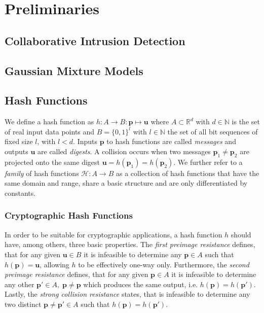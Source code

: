\chapter{Preliminaries}


\section{Collaborative Intrusion Detection}


\section{Gaussian Mixture Models}


\section{Hash Functions}

We define a hash function as $h: A \rightarrow B : \bm{p} \mapsto \bm{u}$ where $A \subset \mathbb{R}^d$ with $d \in \mathbb{N}$ is the set of real input data points and $B=\{0, 1\}^l$ with $l \in \mathbb{N}$ the set of all bit sequences of fixed size $l$, with $l < d$. Inputs $\bm{p}$ to hash functions are called \textit{messages} and outputs $\bm{u}$ are called \textit{digests}. 
A collision occurs when two messages $\bm{p}_1 \neq \bm{p}_2$ are projected onto the same digest $\bm{u} = h(\bm{p}_1) = h(\bm{p}_2)$. We further refer to a \textit{family} of hash functions $\mathcal{H}: A \rightarrow B$ as a collection of hash functions that have the same domain and range, share a basic structure and are only differentiated by constants.

\subsection{Cryptographic Hash Functions}

In order to be suitable for cryptographic applications, a hash function $h$ should have, among others, three basic properties. The \textit{first preimage resistance} defines, that for any given $\bm{u} \in B$ it is infeasible to determine any $\bm{p} \in A$ such that $h(\bm{p})=\bm{u}$, allowing $h$ to be effectively one-way only. Furthermore, the \textit{second preimage resistance} defines, that for any given $\bm{p} \in A$ it is infeasible to determine any other $\bm{p}' \in A,\; \bm{p} \neq \bm{p}$ which produces the same output, i.e. $h(\bm{p})=h(\bm{p}')$. Lastly, the \textit{strong collision resistance} states, that is infeasible to determine any two distinct $\bm{p} \neq \bm{p}' \in A$ such that $h(\bm{p})=h(\bm{p}')$.

